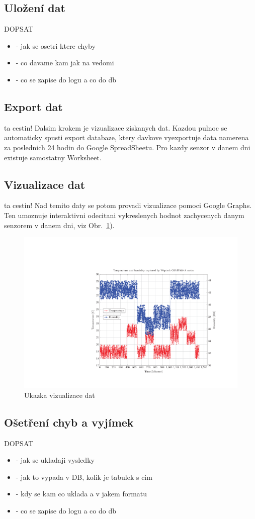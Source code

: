\subsection{Uložení dat}
\colorbox[rgb]{1,0,0}{DOPSAT}
\begin{itemize}
\item - jak se osetri ktere chyby
\item - co davame kam jak na vedomi
\item - co se zapise do logu a co do db
\end{itemize}

\subsection{Export dat}
\colorbox[rgb]{1,0,0}{ta cestin!}
Dalsim krokem je vizualizace ziskanych dat. Kazdou pulnoc se automaticky spusti export databaze, ktery davkove vyexportuje data namerena za poslednich 24 hodin do Google SpreadSheetu. Pro kazdy senzor v danem dni existuje samostatny Worksheet.

\subsection{Vizualizace dat}
\colorbox[rgb]{1,0,0}{ta cestin!}
Nad temito daty se potom provadi vizualizace pomoci Google Graphs. Ten umoznuje interaktivni odecitani vykreslenych hodnot zachycenych danym senzorem v danem dni, viz Obr.~\ref{fig_sec4_chart_example}). 

 \begin{figure}[!ht]
  \begin{center}
    \includegraphics[scale=0.8]{obrazky/chart_weptech}
  \end{center}
  \caption{Ukazka vizualizace dat}
	\label{fig_sec4_chart_example}
\end{figure}

\subsection{Ošetření chyb a vyjímek}
\colorbox[rgb]{1,0,0}{DOPSAT}
\begin{itemize}
\item - jak se ukladaji vysledky
\item - jak to vypada v DB, kolik je tabulek s cim
\item - kdy se kam co uklada a v jakem formatu
\item - co se zapise do logu a co do db
\end{itemize}









